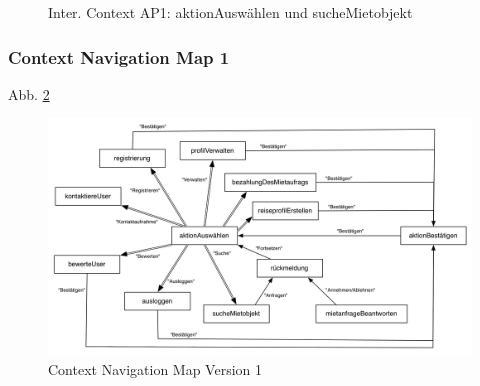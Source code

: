 \begin{figure}[H]
\centering
\hfill
{}
\hfill %
\hfill %
\caption{Inter. Context AP1: aktionAuswählen und sucheMietobjekt }
\label{interfaceContents1}
\end{figure}

\subsubsection{Context Navigation Map 1}

Abb. \ref{fig:navigationmap1}
\begin{figure}[H]
\includegraphics[width=1\textwidth]{./images/navigationmap1.png}
\caption{Context Navigation Map Version 1}
\label{fig:navigationmap1}
\end{figure}


